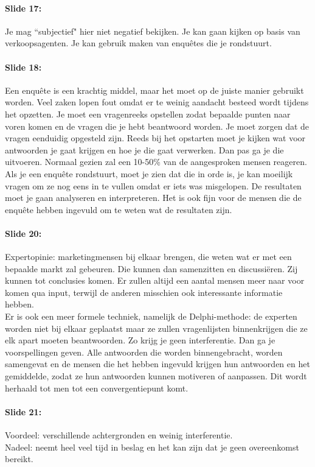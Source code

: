 \documentclass[10pt,a4paper]{report}
\begin{document}
\paragraph{Slide 17:} Je mag ``subjectief" hier niet negatief bekijken. Je kan gaan kijken op basis van verkoopsagenten. Je kan gebruik maken van enqu\^etes die je rondstuurt. 

\paragraph{Slide 18:} Een enqu\^ete is een krachtig middel, maar het moet op de juiste manier gebruikt worden. Veel zaken lopen fout omdat er te weinig aandacht besteed wordt tijdens het opzetten. Je moet een vragenreeks opstellen zodat bepaalde punten naar voren komen en de vragen die je hebt beantwoord worden. Je moet zorgen dat de vragen eenduidig opgesteld zijn. Reeds bij het opstarten moet je kijken wat voor antwoorden je gaat krijgen en hoe je die gaat verwerken. Dan pas ga je die uitvoeren. Normaal gezien zal een 10-50\% van de aangesproken mensen reageren.\\
Als je een enqu\^ete rondstuurt, moet je zien dat die in orde is, je kan moeilijk vragen om ze nog eens in te vullen omdat er iets was misgelopen. De resultaten moet je gaan analyseren en interpreteren. Het is ook fijn voor de mensen die de enqu\^ete hebben ingevuld om te weten wat de resultaten zijn.

\paragraph{Slide 20:} Expertopinie: marketingmensen bij elkaar brengen, die weten wat er met een bepaalde markt zal gebeuren. Die kunnen dan samenzitten en discussi\"eren. Zij kunnen tot conclusies komen. Er zullen altijd een aantal mensen meer naar voor komen qua input, terwijl de anderen misschien ook interessante informatie hebben.\\
Er is ook een meer formele techniek, namelijk de Delphi-methode: de experten worden niet bij elkaar geplaatst maar ze zullen vragenlijsten binnenkrijgen die ze elk apart moeten beantwoorden. Zo krijg je geen interferentie. Dan ga je voorspellingen geven. Alle antwoorden die worden binnengebracht, worden samengevat en de mensen die het hebben ingevuld krijgen hun antwoorden en het gemiddelde, zodat ze hun antwoorden kunnen motiveren of aanpassen. Dit wordt herhaald tot men tot een convergentiepunt komt.

\paragraph{Slide 21:} Voordeel: verschillende achtergronden en weinig interferentie.\\
Nadeel: neemt heel veel tijd in beslag en het kan zijn dat je geen overeenkomst bereikt.
\end{document}
